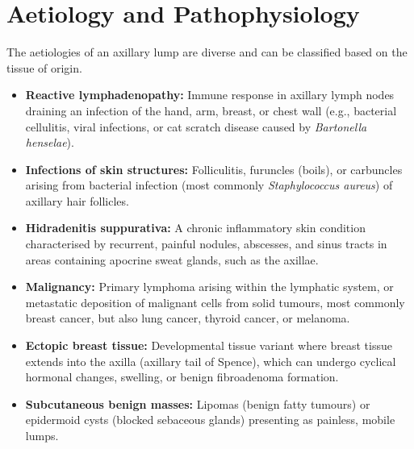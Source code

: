 \section*{Aetiology and Pathophysiology}
The aetiologies of an axillary lump are diverse and can be classified based on the tissue of origin.
\begin{itemize}
    \item \textbf{Reactive lymphadenopathy:} Immune response in axillary lymph nodes draining an infection of the hand, arm, breast, or chest wall (e.g., bacterial cellulitis, viral infections, or cat scratch disease caused by \textit{Bartonella henselae}).
    \item \textbf{Infections of skin structures:} Folliculitis, furuncles (boils), or carbuncles arising from bacterial infection (most commonly \textit{Staphylococcus aureus}) of axillary hair follicles.
    \item \textbf{Hidradenitis suppurativa:} A chronic inflammatory skin condition characterised by recurrent, painful nodules, abscesses, and sinus tracts in areas containing apocrine sweat glands, such as the axillae.
    \item \textbf{Malignancy:} Primary lymphoma arising within the lymphatic system, or metastatic deposition of malignant cells from solid tumours, most commonly breast cancer, but also lung cancer, thyroid cancer, or melanoma.
    \item \textbf{Ectopic breast tissue:} Developmental tissue variant where breast tissue extends into the axilla (axillary tail of Spence), which can undergo cyclical hormonal changes, swelling, or benign fibroadenoma formation.
    \item \textbf{Subcutaneous benign masses:} Lipomas (benign fatty tumours) or epidermoid cysts (blocked sebaceous glands) presenting as painless, mobile lumps.
\end{itemize}

